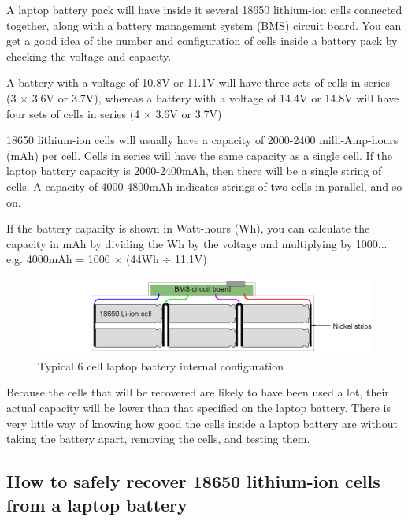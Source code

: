 \documentclass{article}
\theoremstyle{definition}
\theoremstyle{definition}
\theoremstyle{remark}
\begin{document}
    A laptop battery pack will have inside it several 18650 lithium-ion cells connected together, along with a battery management system (BMS) circuit board. You can get a good idea of the number and configuration of cells inside a battery pack by checking the voltage and capacity. 

    A battery with a voltage of 10.8V or 11.1V will have three sets of cells in series (3 \(\times\) 3.6V or 3.7V), whereas a battery with a voltage of 14.4V or 14.8V will have four sets of cells in series (4 \(\times\) 3.6V or 3.7V)

    18650 lithium-ion cells will usually have a capacity of 2000-2400 milli-Amp-hours (mAh) per cell. Cells in series will have the same capacity as a single cell. If the laptop battery capacity is 2000-2400mAh, then there will be a single string of cells. A capacity of 4000-4800mAh indicates strings of two cells in parallel, and so on.

    If the battery capacity is shown in Watt-hours (Wh), you can calculate the capacity in mAh by dividing the Wh by the voltage and multiplying by 1000... e.g. 4000mAh = 1000 \(\times\) (44Wh \(\div\) 11.1V)

    \begin{figure}[h!]
      \centering
      \includegraphics[width=0.75\paperwidth]{Images/image_5_2_(battery_configuration).png}
      \caption*{\centering Typical 6 cell laptop battery internal configuration}
    \end{figure}

    Because the cells that will be recovered are likely to have been used a lot, their actual capacity will be lower than that specified on the laptop battery. There is very little way of knowing how good the cells inside a laptop battery are without taking the battery apart, removing the cells, and testing them.
  

  \subsection{How to safely recover 18650 lithium-ion cells from a laptop battery} %
  \label{sub:how_to_safely_recover_18650_lithium_ion_cells_from_a_laptop_battery}
  
\end{document}
